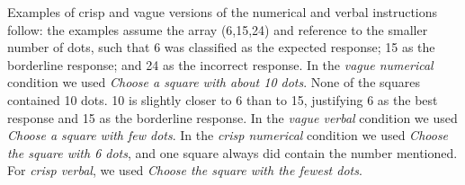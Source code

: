 Examples of crisp and vague versions of the numerical and verbal instructions follow: the examples assume the array (6,15,24) and reference to the smaller number of dots, such that 6 was classified as the expected response; 15 as the borderline response; and 24 as the incorrect response. In the {\em vague numerical} condition we used \emph{Choose a square with about 10 dots}. None of the squares contained 10 dots. 10 is slightly closer to 6 than to 15, justifying 6 as the best response and 15 as the borderline response. In the {\em vague verbal} condition we used \emph{Choose a square with few dots}. In the {\em crisp numerical} condition we used \emph{Choose the square with 6 dots}, and one square always did contain the number mentioned. For {\em crisp verbal}, we used \emph{Choose the square with the fewest dots}.

